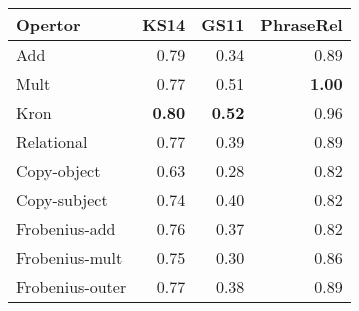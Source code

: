 \begin{tabular}{lrrr}
\toprule
Opertor  &  KS14 &  GS11 &  PhraseRel \\
\midrule
Add             &  0.79 &  0.34 &       0.89 \\
Mult            &  0.77 &  0.51 &       \textbf{1.00} \\
Kron            &  \textbf{0.80} &  \textbf{0.52} &       0.96 \\
Relational      &  0.77 &  0.39 &       0.89 \\
Copy-object     &  0.63 &  0.28 &       0.82 \\
Copy-subject    &  0.74 &  0.40 &       0.82 \\
Frobenius-add   &  0.76 &  0.37 &       0.82 \\
Frobenius-mult  &  0.75 &  0.30 &       0.86 \\
Frobenius-outer &  0.77 &  0.38 &       0.89 \\
\bottomrule
\end{tabular}

